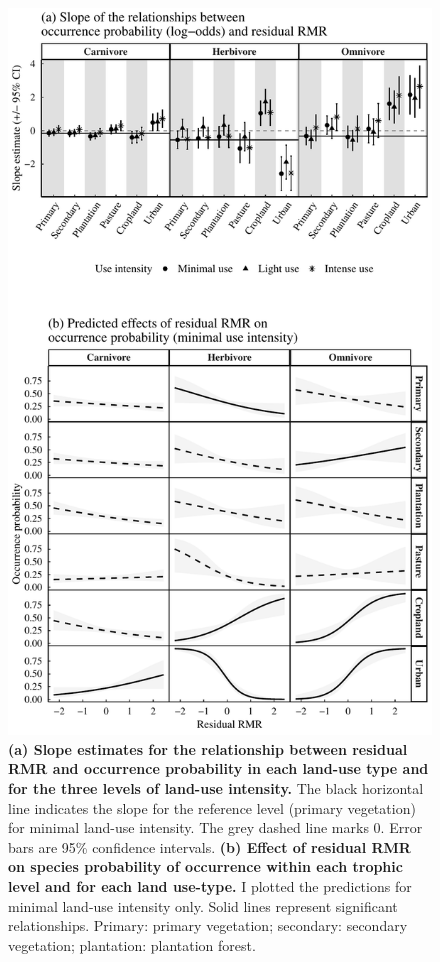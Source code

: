\clearpage
\begin{figure}[h!]
\centering
\includegraphics[scale=0.65]{figures/Chapter5/Figure4}
\caption[Slope estimates and predictions for the relationship between occurrence probability and residual RMR]{\textbf{(a) Slope estimates for the relationship between residual RMR and occurrence probability in each land-use type and for the three levels of land-use intensity.} The black horizontal line indicates the slope for the reference level (primary vegetation) for minimal land-use intensity. The grey dashed line marks 0. Error bars are 95\% confidence intervals. \textbf{(b) Effect of residual RMR on species probability of occurrence within each trophic level and for each land use-type.} I plotted the predictions for minimal land-use intensity only. Solid lines represent significant relationships. Primary: primary vegetation; secondary: secondary vegetation; plantation: plantation forest.}
\label{chap5_fig4}
\end{figure}

